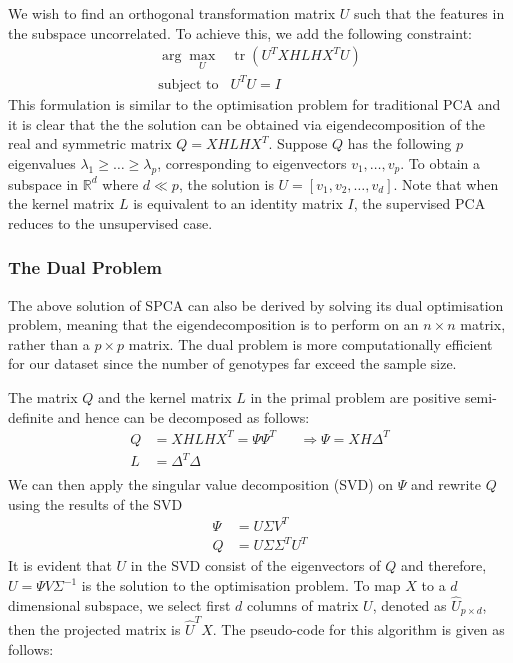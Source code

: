 \documentclass[a4paper,12pt]{article}
\begin{document}
We wish to find an orthogonal transformation matrix $U$ such that the features in the subspace uncorrelated. To achieve this, we add the following constraint:
\begin{equation} \label{SPCA}
\begin{array}{cc}\arg \max _{U} & \operatorname{tr}\left(U^{T} X H L H X^{T} U\right) \\
\text {subject to} & U^{T} U=I
\end{array}
\end{equation}
This formulation is similar to the optimisation problem for traditional PCA and it is clear that the the solution can be obtained via eigendecomposition of the real and symmetric matrix $Q = X H L H X^{T}$. Suppose $Q$ has the following $p$ eigenvalues $\lambda_{1} \geq \ldots \geq \lambda_{p}$, corresponding to eigenvectors $v_{1}, \ldots, v_{p}$. To obtain a subspace in $\mathbb{R}^{d}$ where $d \ll p$, the solution is $U=\left[v_{1}, v_{2}, \ldots, v_{d}\right]$. Note that when the kernel matrix $L$ is equivalent to an identity matrix $I$, the supervised PCA reduces to the unsupervised case. 

\subsubsection{The Dual Problem} 
The above solution of SPCA can also be derived by solving its dual optimisation problem, meaning that the eigendecomposition is to perform on an $n \times n$ matrix, rather than a $p \times p$ matrix. The dual problem is more computationally efficient for our dataset since the number of genotypes far exceed the sample size. 

The matrix $Q$ and the kernel matrix $L$ in the primal problem are positive semi-definite and hence can be decomposed as follows:
\begin{align*}
Q &=X H L H X^{T}=\Psi \Psi^{T}  \hspace{20pt} \Rightarrow \Psi =X H \Delta^{T}\\
L &=\Delta^{T} \Delta \\
\end{align*}
We can then apply the singular value decomposition (SVD) on $\Psi$ and rewrite $Q$ using the results of the SVD
\begin{align*}
\Psi &= U \Sigma V^{T} \\
Q &= U \Sigma \Sigma^{T} U^{T}
\end{align*}
It is evident that $U$ in the SVD consist of the eigenvectors of $Q$ and therefore, $U = \Psi V \Sigma^{-1}$ is the solution to the optimisation problem. To map $X$ to a $d$ dimensional subspace, we select first $d$ columns of matrix $U$, denoted as $\hat{U}_{p \times d}$, then the projected matrix is $\hat{U}^{T}X$. The pseudo-code for this algorithm is given as follows:
\end{document}
